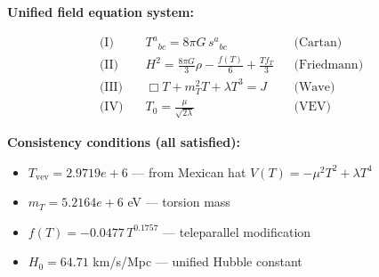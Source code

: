 
\textbf{Unified field equation system:}

\begin{align}
  \text{(I)} \quad & T^a{}_{bc} = 8\pi G \, s^a{}_{bc} && \text{(Cartan)} \\
  \text{(II)} \quad & H^2 = \frac{8\pi G}{3}\rho - \frac{f(T)}{6} + \frac{Tf_T}{3} && \text{(Friedmann)} \\
  \text{(III)} \quad & \Box T + m_T^2 T + \lambda T^3 = J && \text{(Wave)} \\
  \text{(IV)} \quad & T_0 = \frac{\mu}{\sqrt{2\lambda}} && \text{(VEV)}
\end{align}

\textbf{Consistency conditions (all satisfied):}
\begin{itemize}
  \item $T_{\text{vev}} = 2.9719e+6$ — from Mexican hat $V(T) = -\mu^2 T^2 + \lambda T^4$
  \item $m_T = 5.2164e+6$ eV — torsion mass
  \item $f(T) = -0.0477 \, T^{0.1757}$ — teleparallel modification
  \item $H_0 = 64.71$ km/s/Mpc — unified Hubble constant
\end{itemize}